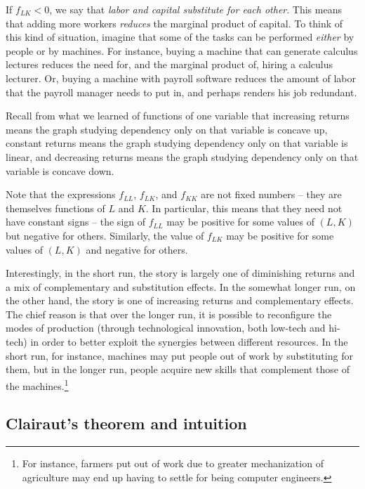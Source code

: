 \documentclass[10pt]{amsart}
\begin{document}
\begin{itemize}
  If $f_{LK} < 0$, we say that {\em labor and capital substitute for
  each other}. This means that adding more workers {\em reduces} the
  marginal product of capital. To think of this kind of situation,
  imagine that some of the tasks can be performed {\em either} by
  people or by machines. For instance, buying a machine that can
  generate calculus lectures reduces the need for, and the marginal
  product of, hiring a calculus lecturer. Or, buying a machine with
  payroll software reduces the amount of labor that the payroll
  manager needs to put in, and perhaps renders his job redundant.
\end{itemize}

Recall from what we learned of functions of one variable that
increasing returns means the graph studying dependency only on that
variable is concave up, constant returns means the graph studying
dependency only on that variable is linear, and decreasing returns
means the graph studying dependency only on that variable is concave
down.

Note that the expressions $f_{LL}$, $f_{LK}$, and $f_{KK}$ are not
fixed numbers -- they are themselves functions of $L$ and $K$. In
particular, this means that they need not have constant signs -- the
sign of $f_{LL}$ may be positive for some values of $(L,K)$ but
negative for others. Similarly, the value of $f_{LK}$ may be positive
for some values of $(L,K)$ and negative for others.

Interestingly, in the short run, the story is largely one of
diminishing returns and a mix of complementary and substitution
effects. In the somewhat longer run, on the other hand, the story is
one of increasing returns and complementary effects. The chief reason
is that over the longer run, it is possible to reconfigure the modes
of production (through technological innovation, both low-tech and
hi-tech) in order to better exploit the synergies between different
resources. In the short run, for instance, machines may put people out
of work by substituting for them, but in the longer run, people
acquire new skills that complement those of the machines.\footnote{For
instance, farmers put out of work due to greater mechanization of
agriculture may end up having to settle for being computer engineers.}

\subsection*{Clairaut's theorem and intuition}
\end{document}
